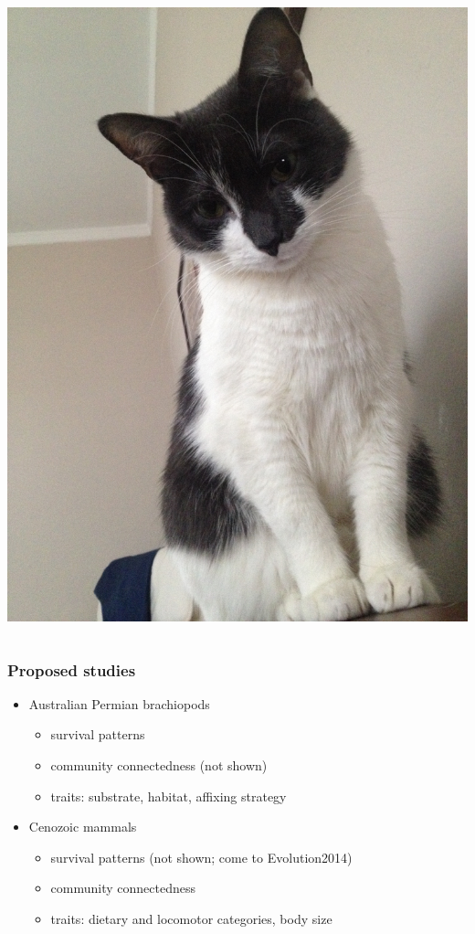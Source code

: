 \documentclass{beamer}
\begin{document}
\begin{frame}
\begin{columns}
\begin{column}{0.5\textwidth}
      \begin{center}
        \includegraphics[height = 0.4\textheight, keepaspectratio = true]{figure/annyong}
      \end{center}
    \end{column}
  \end{columns}
\end{frame}

\begin{frame}
  \frametitle{Proposed studies}

  \begin{itemize}
    \item Australian Permian brachiopods
      \begin{itemize}
        \item survival patterns
        \item community connectedness (not shown)
        \item traits: substrate, habitat, affixing strategy
      \end{itemize}
    \item Cenozoic mammals
      \begin{itemize}
        \item survival patterns (not shown; come to Evolution2014)
        \item community connectedness
        \item traits: dietary and locomotor categories, body size
      \end{itemize}
  \end{itemize}
\end{frame}
\end{document}
